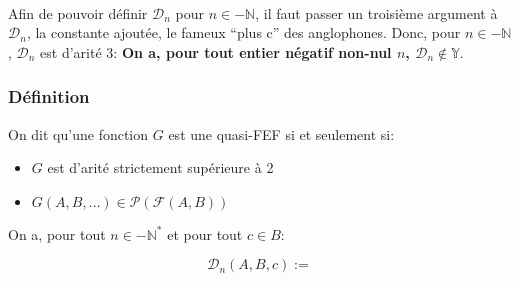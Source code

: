 \documentclass{article}
\newcommand{\Y}{{\mathbb Y}}
\newcommand{\N}{{\mathbb N}}
\newcommand{\cD}{{\mathcal D}}
\newcommand{\cF}{{\mathcal F}}
\begin{document}
\paragraph{}
Afin de pouvoir définir $\cD_n$ pour $n \in -\N$, il faut passer un troisième argument à $\cD_n$, la constante ajoutée, le fameux “plus c” des anglophones. Donc, pour $n \in -\N$, $\cD_n$ est d'arité 3: {\bf On a, pour tout entier négatif non-nul $n$, $\cD_n \not \in \Y$}.


\subsubsection{Définition}

On dit qu'une fonction $G$ est une quasi-FEF si et seulement si:

\begin{itemize}
	\item $G$ est d'arité strictement supérieure à 2
	\item $G(A, B, \ldots) \in \mathcal P(\cF(A, B))$
\end{itemize}

On a, pour tout $n \in -\N^\ast$ et pour tout $c \in B$:

\[
	\mathcal D_n(A, B, c) := 
\]

\newpage
\tableofcontents
\end{document}
